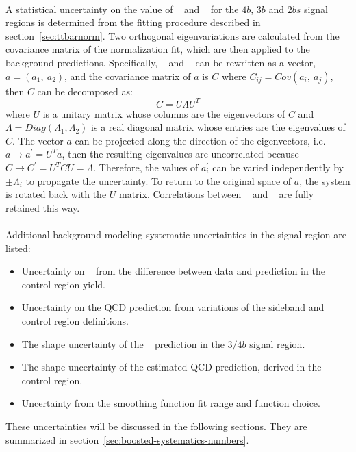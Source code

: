\paragraph{}
A statistical uncertainty on the value of \muqcd~ and \alphatt~ for the $4b$, $3b$ and $2bs$ signal regions is determined from the fitting procedure described in section~\ref{sec:ttbarnorm}.
Two orthogonal eigenvariations are calculated from the covariance matrix of the normalization fit, which are then applied to the background predictions.  
Specifically, \muqcd~ and \alphatt~ can be rewritten as a vector, $a = (a_1,\ a_2)$, and the covariance matrix of $a$ is $C$ where $C_{ij} = Cov(a_i,\ a_j)$, then $C$ can be decomposed as:
\begin{equation}
C = U \Lambda U^{T}
\end{equation}
where $U$ is a unitary matrix whose columns are the eigenvectors of $C$ and $\Lambda = Diag(\Lambda_{1},\Lambda_{2})$ is a real diagonal matrix whose entries are the eigenvalues of $C$.
The vector $a$ can be projected along the direction of the eigenvectors, i.e. $a \to a^{\prime} = U^{T}a$, then the resulting eigenvalues are uncorrelated because $C \to C^{\prime} = U^{T} C U = \Lambda$.  
Therefore, the values of $a^{\prime}_{i}$ can be varied independently by $\pm \Lambda_i$ to propagate the uncertainty.  
To return to the original space of $a$, the system is rotated back with the $U$ matrix.
Correlations between \alphatt~ and \muqcd~ are fully retained this way.

\paragraph{}
Additional background modeling systematic uncertainties in the signal region are listed:
\begin{itemize}
 \item Uncertainty on \muqcd~ from the difference between data and prediction in the control region yield.
 \item Uncertainty on the QCD prediction from variations of the sideband and control region definitions.
 \item The shape uncertainty of the \ttbar~ prediction in the $3/4b$ signal region.
 \item The shape uncertainty of the estimated QCD prediction, derived in the control region.
 \item Uncertainty from the smoothing function fit range and function choice.
\end{itemize}
These uncertainties will be discussed in the following sections.
They are summarized in section~\ref{sec:boosted-systematics-numbers}.

